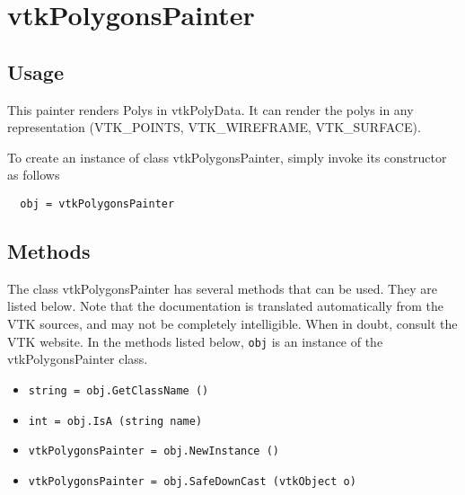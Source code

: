 \section{vtkPolygonsPainter}

\subsection{Usage}

 This painter renders Polys in vtkPolyData. It can render the polys
 in any representation (VTK\_POINTS, VTK\_WIREFRAME, VTK\_SURFACE).

To create an instance of class vtkPolygonsPainter, simply
invoke its constructor as follows
\begin{verbatim}
  obj = vtkPolygonsPainter
\end{verbatim}
\subsection{Methods}

The class vtkPolygonsPainter has several methods that can be used.
  They are listed below.
Note that the documentation is translated automatically from the VTK sources,
and may not be completely intelligible.  When in doubt, consult the VTK website.
In the methods listed below, \verb|obj| is an instance of the vtkPolygonsPainter class.
\begin{itemize}
\item  \verb|string = obj.GetClassName ()|

\item  \verb|int = obj.IsA (string name)|

\item  \verb|vtkPolygonsPainter = obj.NewInstance ()|

\item  \verb|vtkPolygonsPainter = obj.SafeDownCast (vtkObject o)|

\end{itemize}

